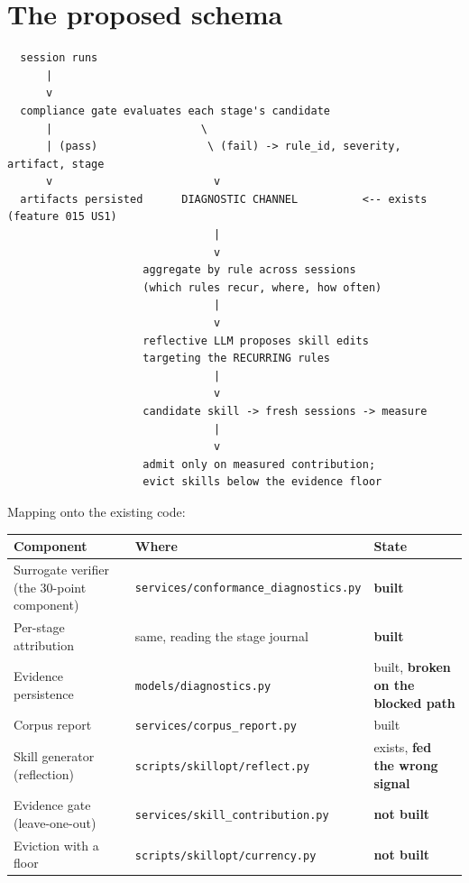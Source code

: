\documentclass[11pt,a4paper]{article}
\begin{document}
\section{The proposed schema}

\begin{lstlisting}
  session runs
      |
      v
  compliance gate evaluates each stage's candidate
      |                       \
      | (pass)                 \ (fail) -> rule_id, severity, artifact, stage
      v                         v
  artifacts persisted      DIAGNOSTIC CHANNEL          <-- exists (feature 015 US1)
                                |
                                v
                     aggregate by rule across sessions
                     (which rules recur, where, how often)
                                |
                                v
                     reflective LLM proposes skill edits
                     targeting the RECURRING rules
                                |
                                v
                     candidate skill -> fresh sessions -> measure
                                |
                                v
                     admit only on measured contribution;
                     evict skills below the evidence floor
\end{lstlisting}

Mapping onto the existing code:

\begin{center}
\begin{tabular}{@{}p{}p{}p{}@{}}
\toprule
\textbf{Component} & \textbf{Where} & \textbf{State} \\
\midrule
Surrogate verifier (the 30-point component) & \texttt{services/conformance\_diagnostics.py} & \textbf{built} \\
Per-stage attribution & same, reading the stage journal & \textbf{built} \\
Evidence persistence & \texttt{models/diagnostics.py} & built, \textbf{broken on the blocked path} \\
Corpus report & \texttt{services/corpus\_report.py} & built \\
Skill generator (reflection) & \texttt{scripts/skillopt/reflect.py} & exists, \textbf{fed the wrong signal} \\
Evidence gate (leave-one-out) & \texttt{services/skill\_contribution.py} & \textbf{not built} \\
Eviction with a floor & \texttt{scripts/skillopt/currency.py} & \textbf{not built} \\
\bottomrule
\end{tabular}
\end{center}
\end{document}
